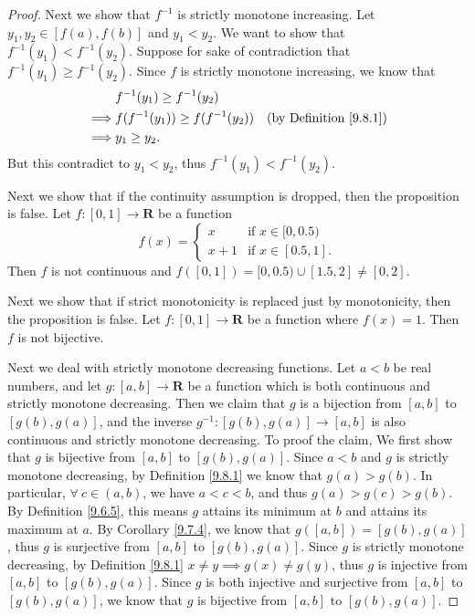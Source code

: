\begin{proof}
    Next we show that \(f^{-1}\) is strictly monotone increasing.
    Let \(y_1, y_2 \in [f(a), f(b)]\) and \(y_1 < y_2\).
    We want to show that \(f^{-1}(y_1) < f^{-1}(y_2)\).
    Suppose for sake of contradiction that \(f^{-1}(y_1) \geq f^{-1}(y_2)\).
    Since \(f\) is strictly monotone increasing, we know that
    \begin{align*}
                 & f^{-1}(y_1) \geq f^{-1}(y_2)                                            \\
        \implies & f(f^{-1}(y_1)) \geq f(f^{-1}(y_2)) & \text{(by Definition \ref{9.8.1})} \\
        \implies & y_1 \geq y_2.
    \end{align*}
    But this contradict to \(y_1 < y_2\), thus \(f^{-1}(y_1) < f^{-1}(y_2)\).

    Next we show that if the continuity assumption is dropped, then the proposition is false.
    Let \(f : [0, 1] \to \mathbf{R}\) be a function
    \[
        f(x) = \begin{cases}
            x     & \text{if } x \in [0, 0.5)  \\
            x + 1 & \text{if } x \in [0.5, 1].
        \end{cases}
    \]
    Then \(f\) is not continuous and \(f([0, 1]) = [0, 0.5) \cup [1.5, 2] \neq [0, 2]\).

    Next we show that if strict monotonicity is replaced just by monotonicity, then the proposition is false.
    Let \(f : [0, 1] \to \mathbf{R}\) be a function where \(f(x) = 1\).
    Then \(f\) is not bijective.

    Next we deal with strictly monotone decreasing functions.
    Let \(a < b\) be real numbers, and let \(g : [a, b] \to \mathbf{R}\) be a function which is both continuous and strictly monotone decreasing.
    Then we claim that \(g\) is a bijection from \([a, b]\) to \([g(b), g(a)]\), and the inverse \(g^{-1} : [g(b), g(a)] \to [a, b]\) is also continuous and strictly monotone decreasing.
    To proof the claim, We first show that \(g\) is bijective from \([a, b]\) to \([g(b), g(a)]\).
    Since \(a < b\) and \(g\) is strictly monotone decreasing, by Definition \ref{9.8.1} we know that \(g(a) > g(b)\).
    In particular, \(\forall\ c \in (a, b)\), we have \(a < c < b\), and thus \(g(a) > g(c) > g(b)\).
    By Definition \ref{9.6.5}, this means \(g\) attains its minimum at \(b\) and attains its maximum at \(a\).
    By Corollary \ref{9.7.4}, we know that \(g([a, b]) = [g(b), g(a)]\), thus \(g\) is surjective from \([a, b]\) to \([g(b), g(a)]\).
    Since \(g\) is strictly monotone decreasing, by Definition \ref{9.8.1} \(x \neq y \implies g(x) \neq g(y)\), thus \(g\) is injective from \([a, b]\) to \([g(b), g(a)]\).
    Since \(g\) is both injective and surjective from \([a, b]\) to \([g(b), g(a)]\), we know that \(g\) is bijective from \([a, b]\) to \([g(b), g(a)]\).


\end{proof}

